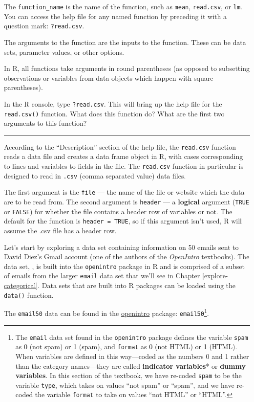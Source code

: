 \documentclass[
  10pt,
  openany]{book}
\theoremstyle{definition}
\theoremstyle{definition}
\theoremstyle{definition}
\theoremstyle{definition}
\theoremstyle{remark}
\begin{document}
The \texttt{function\_name} is the name of the function, such as \texttt{mean}, \texttt{read.csv}, or \texttt{lm}.
You can access the help file for any named function by preceding it with a question mark: \texttt{?read.csv}.

The arguments to the function are the inputs to the function. These can be data sets, parameter values, or other options.

In R, all functions take arguments in round parentheses (as opposed to
subsetting observations or variables from data objects which happen
with square parentheses).

In the R console, type \texttt{?read.csv}. This will bring up the help file for the \texttt{read.csv()} function. What does this function do? What are the first two arguments to this function?

\begin{center}\rule{0.5\linewidth}{0.5pt}\end{center}

According to the ``Description'' section of the help file, the \texttt{read.csv} function
reads a data file and creates a data frame object in R, with cases corresponding
to lines and variables to fields in the file. The \texttt{read.csv} function in particular
is designed to read in \texttt{.csv} (comma separated value) data files.

The first argument is the \texttt{file} --- the name of the file or website which the data are to be read from. The second argument is \texttt{header} --- a \textbf{logical} argument (\texttt{TRUE} or \texttt{FALSE}) for whether the file contains a header row of variables or not.
The default for the function is \texttt{header\ =\ TRUE}, so if this argument isn't used,
R will assume the .csv file has a header row.

Let's start by exploring a data set containing information on 50 emails
sent to David Diez's Gmail account (one of the authors of the \emph{OpenIntro}
textbooks). The data set, , is built into the \texttt{openintro}
package in R and is comprised of a subset of emails from the larger \texttt{email}
data set that we'll see in Chapter \ref{explore-categorical}.
Data sets that are built into R packages can be loaded using the \texttt{data()} function.

The \texttt{email50} data can be found in the \href{http://openintrostat.github.io/openintro/reference/index.html}{openintro} package: \texttt{email50}\footnote{The \texttt{email} data set found in the \texttt{openintro} package defines the variable \texttt{spam} as 0 (not spam) or 1 (spam), and \texttt{format} as 0 (not HTML) or 1 (HTML). When variables are defined in this way---coded as the numbers 0 and 1 rather than the category names---they are called \textbf{indicator variables}* or \textbf{dummy variables}. In this section of the textbook, we have re-coded \texttt{spam} to be the variable \texttt{type}, which takes on values ``not spam'' or ``spam'', and we have re-coded the variable \texttt{format} to take on values ``not HTML'' or ``HTML''.}.
\end{document}
